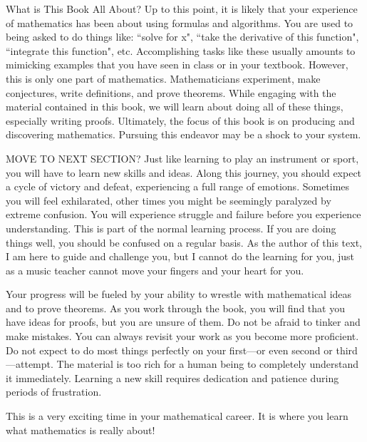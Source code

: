 \begin{section}{What is This Book All About?}
Up to this point, it is likely that your experience of mathematics has been about using formulas and algorithms. You are used to being asked to do things like: ``solve for x", ``take the derivative of this function", ``integrate this function", etc. Accomplishing tasks like these usually amounts to mimicking examples that you have seen in class or in your textbook. However, this is only one part of mathematics.  Mathematicians experiment, make conjectures, write definitions, and prove theorems.  While engaging with the material contained in this book, we will learn about doing all of these things, especially writing proofs. Ultimately, the focus of this book is on producing and discovering mathematics. Pursuing this endeavor may be a shock to your system.

MOVE TO NEXT SECTION? Just like learning to play an instrument or sport, you will have to learn new skills and ideas. Along this journey, you should expect a cycle of victory and defeat, experiencing a full range of emotions.  Sometimes you will feel exhilarated, other times you might be seemingly paralyzed by extreme confusion. You will experience struggle and failure before you experience understanding. This is part of the normal learning process. If you are doing things well, you should be confused on a regular basis. As the author of this text, I am here to guide and challenge you, but I cannot do the learning for you, just as a music teacher cannot move your fingers and your heart for you.  %

Your progress will be fueled by your ability to wrestle with mathematical ideas and to prove theorems.  As you work through the book, you will find that you have ideas for proofs, but you are unsure of them.  Do not be afraid to tinker and make mistakes.  You can always revisit your work as you become more proficient. Do not expect to do most things perfectly on your first---or even second or third---attempt. The material is too rich for a human being to completely understand it immediately. Learning a new skill requires dedication and patience during periods of frustration.

This is a very exciting time in your mathematical career.  It is where you learn what mathematics is really about!



\end{section}
